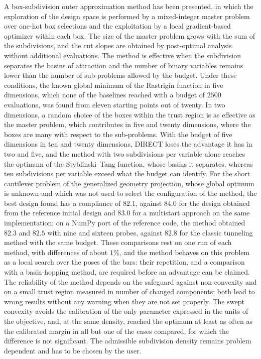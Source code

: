 \documentclass[pdflatex,sn-basic]{sn-jnl}
\begin{document}
A box-subdivision outer approximation method has been presented, in which the
exploration of the design space is performed by a mixed-integer master problem
over one-hot box selections and the exploitation by a local gradient-based
optimizer within each box. The size of the master problem grows with the sum of
the subdivisions, and the cut slopes are obtained by post-optimal analysis
without additional evaluations. The method is effective when the subdivision
separates the basins of attraction and the number of binary variables remains
lower than the number of sub-problems allowed by the budget. Under these
conditions, the known global minimum of the Rastrigin function in five
dimensions, which none of the baselines reached with a budget of $2500$
evaluations, was found from eleven starting points out of twenty. In two
dimensions, a random choice of the boxes within the trust region is as effective
as the master problem, which contributes in five and twenty dimensions, where the
boxes are many with respect to the sub-problems. With the budget of five
dimensions in ten and twenty dimensions, DIRECT loses the advantage it has in two
and five, and the method with two subdivisions per variable alone reaches the
optimum of the Styblinski--Tang function, whose basins it separates, whereas
ten subdivisions per variable exceed what the budget can identify. For the short
cantilever problem of the generalized geometry projection, whose global optimum
is unknown and which was not used to select the configuration of the method,
the best design found has a compliance of $82.1$, against $84.0$ for the design
obtained from the reference initial design and $83.0$ for a multistart approach
on the same implementation; on a NumPy port of the reference code, the method
obtained $82.3$ and $82.5$ with nine and sixteen probes, against $82.8$ for the
classic tunneling method with the same budget. These comparisons rest on one run
of each method, with differences of about $1\%$, and the method behaves on this
problem as a local search over the poses of the bars: their repetition, and a
comparison with a basin-hopping method, are required before an advantage can
be claimed. The
reliability of
the method depends on the safeguard against non-convexity and on a small
trust region measured in number of changed components; both lead to wrong
results without any warning when they are not set properly. The swept
convexity avoids the calibration of the only parameter expressed in the units of
the objective, and, at the same density, reached the optimum at least as often
as the calibrated margin in all but one of the cases compared, for which the
difference is not significant. The admissible subdivision density
remains problem dependent and has to be chosen by the user.
\end{document}
